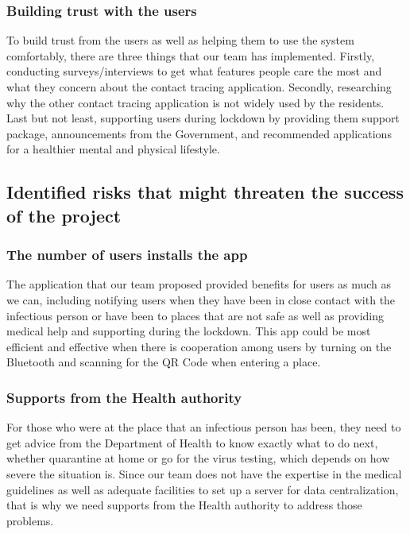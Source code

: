     \subsubsection{Building trust with the users}
      \par To build trust from the users as well as helping them to use the system comfortably, there are three things that our team has implemented.  Firstly, conducting surveys/interviews to get what features people care the most and what they concern about the contact tracing application. Secondly, researching why the other contact tracing application is not widely used by the residents.  Last but not least, supporting users during lockdown by providing them support package, announcements from the  Government, and recommended applications for a healthier mental and physical lifestyle.

  \subsection{Identified risks that might threaten the success of the project}
    \subsubsection{The number of users installs the app}
      \par The application that our team proposed provided benefits for users as much as we can, including notifying users when they have been in close contact with the infectious person or have been to places that are not safe as well as providing medical help and supporting during the lockdown. This app could be most efficient and effective when there is cooperation among users by turning on the Bluetooth and scanning for the QR Code when entering a place.

    \subsubsection{Supports from the Health authority}
      \par For those who were at the place that an infectious person has been, they need to get advice from the Department of Health to know exactly what to do next, whether quarantine at home or go for the virus testing, which depends on how severe the situation is. Since our team does not have the expertise in the medical guidelines as well as adequate facilities to set up a server for data centralization, that is why we need supports from the Health authority to address those problems.


